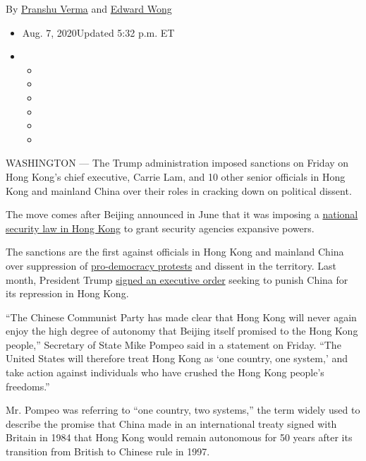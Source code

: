 By \href{https://www.nytimes3xbfgragh.onion/by/pranshu-verma}{Pranshu
Verma} and
\href{https://www.nytimes3xbfgragh.onion/by/edward-wong}{Edward Wong}

\begin{itemize}
\item
  Aug. 7, 2020Updated 5:32 p.m. ET
\item
  \begin{itemize}
  \item
  \item
  \item
  \item
  \item
  \item
  \end{itemize}
\end{itemize}

WASHINGTON --- The Trump administration imposed sanctions on Friday on
Hong Kong's chief executive, Carrie Lam, and 10 other senior officials
in Hong Kong and mainland China over their roles in cracking down on
political dissent.

The move comes after Beijing announced in June that it was imposing a
\href{https://www.nytimes3xbfgragh.onion/2020/06/30/world/asia/hong-kong-security-law-explain.html}{national
security law in Hong Kong} to grant security agencies expansive powers.

The sanctions are the first against officials in Hong Kong and mainland
China over suppression of
\href{https://www.nytimes3xbfgragh.onion/2020/05/27/world/asia/why-are-hong-kong-protesters.html}{pro-democracy
protests} and dissent in the territory. Last month, President Trump
\href{https://www.nytimes3xbfgragh.onion/2020/07/14/us/politics/trump-news-conference.html}{signed
an executive order} seeking to punish China for its repression in Hong
Kong.

``The Chinese Communist Party has made clear that Hong Kong will never
again enjoy the high degree of autonomy that Beijing itself promised to
the Hong Kong people,'' Secretary of State Mike Pompeo said in a
statement on Friday. ``The United States will therefore treat Hong Kong
as `one country, one system,' and take action against individuals who
have crushed the Hong Kong people's freedoms.''

Mr. Pompeo was referring to ``one country, two systems,'' the term
widely used to describe the promise that China made in an international
treaty signed with Britain in 1984 that Hong Kong would remain
autonomous for 50 years after its transition from British to Chinese
rule in 1997.

